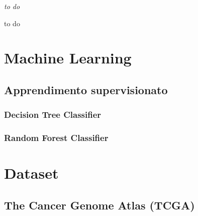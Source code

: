 \documentclass[12pt,italian]{report}
\begin{document}
	
	\frontespizio
	\beforepreface
	
	
	{\raggedleft \large \sl to do\\
		
	}
	
	
	
	
	
	
	
	to do
	
	
	\afterpreface
	
	
	\chapter{Machine Learning}
	\section{Apprendimento supervisionato}
	\subsection{Decision Tree Classifier}
	\subsection{Random Forest Classifier}
	
	\chapter{Dataset}
	\section{The Cancer Genome Atlas (TCGA)}
	
\end{document}
